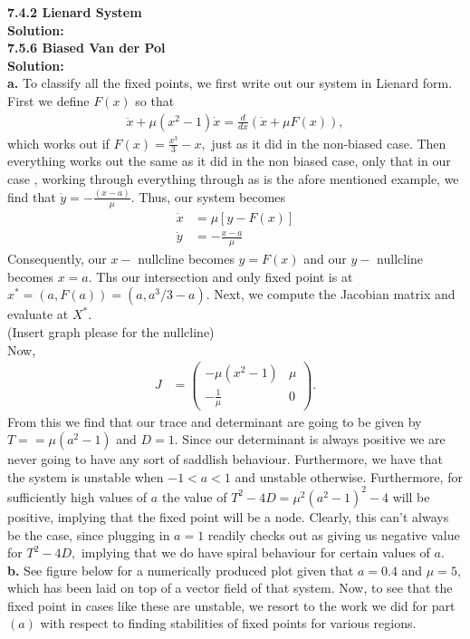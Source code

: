 \documentclass[12pt]{article}
\begin{document}
\bigskip\noindent
{\bf 7.4.2 Lienard System} \\
{\bf Solution:} \\
{\bf 7.5.6 Biased Van der Pol} \\
{\bf Solution:}\\
\indent
{\bf a. } To classify all the fixed points, we first write out our system in Lienard form. First we define $F(x)$ so that
\begin{align*}
\ddot{x}+\mu(x^2-1)\dot{x}=\frac{d}{dx}\left(\dot{x}+\mu F(x)\right),
\end{align*}
which works out if $F(x)=\frac{x^3}{3}-x,$  just as it did in the non-biased case. Then everything works out the same as it did in the non biased case, only that in our case , working through everything through as is the afore mentioned example, we find that $\dot{y}=-\frac{(x-a)}{\mu}.$ Thus, our system becomes
\begin{align*}
\dot{x} &=\mu[y-F(x)]\\
\dot{y} &=-\frac{x-a}{\mu}
\end{align*}
Consequently, our $x-$ nullcline becomes $y=F(x)$ and our $y-$ nullcline becomes $x=a.$ Ths our intersection and only fixed point is at $x^*=\left(a,F(a)\right)=\left(a,a^3/3-a\right).$ Next, we compute the Jacobian matrix and evaluate at $X^*.$\\
(Insert graph please for the nullcline)\\
Now,\\
\begin{align*}
J&=\left(\begin{array}{cc} -\mu (x^2-1) & \mu \\
-\frac{1}{\mu} & 0
\end{array}\right).
\end{align*}
From this we find that our trace and determinant are going to be given by $T==\mu(a^2-1)$ and $D=1.$ Since our determinant is always positive we are never going to have any sort of saddlish behaviour. Furthermore, we have that the system is unstable when $-1< a <1$ and unstable otherwise. Furthermore, for sufficiently high values of $a$ the value of $T^2-4D=\mu^2(a^2-1)^2-4$ will be positive, implying that the fixed point will be a node. Clearly, this can't always be the case, since plugging in $a=1$ readily checks out as giving us negative value for $T^2-4D,$ implying that we do have spiral behaviour for certain values of $a.$\\
\indent
{\bf b. } See figure below for a numerically produced plot given that $a=0.4$ and $\mu=5,$ which has been laid on top of a vector field of that system. Now, to see that the fixed point in cases like these are unstable, we resort to the work we did for part $(a)$ with respect to finding stabilities of fixed points for various regions.\\
\end{document}
